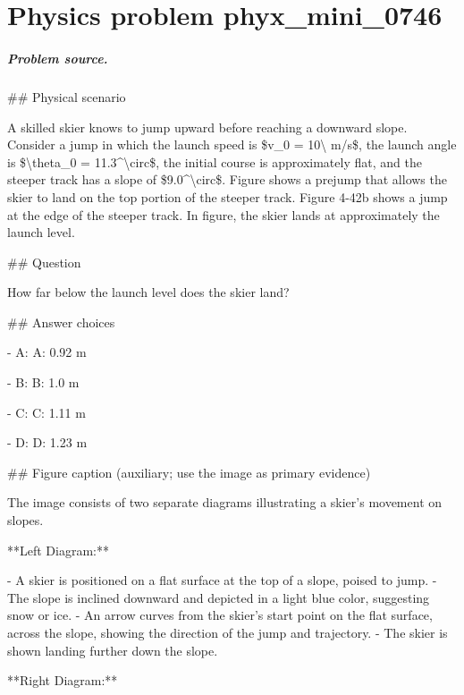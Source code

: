 
\chapter{Physics problem phyx\_mini\_0746}
\label{ch:PhyXMiniProblems_problem_phyx_mini_0746}

\paragraph{Problem source.}
\#\# Physical scenario

A skilled skier knows to jump upward before reaching a downward slope. Consider a jump in which the launch speed is \$v\_0 = 10\textbackslash{} m/s\$, the launch angle is \$\textbackslash{}theta\_0 = 11.3\textasciicircum{}\textbackslash{}circ\$, the initial course is approximately flat, and the steeper track has a slope of \$9.0\textasciicircum{}\textbackslash{}circ\$. Figure shows a prejump that allows the skier to land on the top portion of the steeper track. Figure 4-42b shows a jump at the edge of the steeper track. In figure, the skier lands at approximately the launch level.

\#\# Question

How far below the launch level does the skier land?

\#\# Answer choices

- A: A: 0.92 m

- B: B: 1.0 m

- C: C: 1.11 m

- D: D: 1.23 m

\#\# Figure caption (auxiliary; use the image as primary evidence)

The image consists of two separate diagrams illustrating a skier's movement on slopes.

**Left Diagram:**

- A skier is positioned on a flat surface at the top of a slope, poised to jump.
- The slope is inclined downward and depicted in a light blue color, suggesting snow or ice.
- An arrow curves from the skier's start point on the flat surface, across the slope, showing the direction of the jump and trajectory.
- The skier is shown landing further down the slope.

**Right Diagram:**

